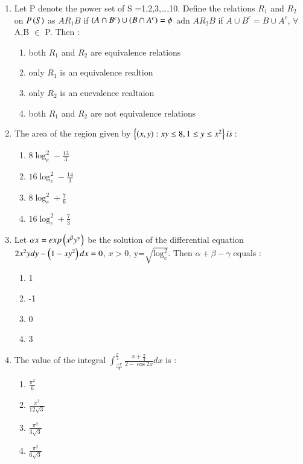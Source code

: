 \documentclass[journal]{IEEEtran}
\begin{document}
\begin{enumerate}
	\item Let P denote the power set of S ={1,2,3,\ldots,10}. Define the relations $R_1$ and $R_2$ on $P\left(S\right)$ as $AR_1B$ if $\left(A \cap B^c\right)\cup \left(B\cap A^c\right)=\phi$ adn $AR_2B$ if $A\cup B^c=B\cup A^c$, $\forall$ A,B $\in$ P. Then :
		\begin{enumerate}
			\item both $R_1$ and $R_2$ are equivalence relations
			\item only $R_1$ is an equivalence realtion
			\item only $R_2$ is an euevalence realtaion
			\item both $R_1$ and $R_2$ are not equivalence relations
        	\end{enumerate}	
	\item The area of the region given by $\left\{\left(x,y\right):xy \leq 8, 1 \leq y \leq x^2 \right\} is :$
		\begin{enumerate}
			\item $8 \log^{2}_e-\frac{13}{3}$
			\item $16 \log^{2}_e-\frac{14}{3}$
			\item $8 \log^{2}_e+\frac{7}{6}$
			\item $16 \log^{2}_e+\frac{7}{3}$
        	\end{enumerate}	
	\item Let $\alpha x=exp\left(x^\beta y^\gamma\right)$ be the solution of the differential equation $2x^2ydy-\left(1-xy^2\right)dx=0$, $x>0$, y=$\sqrt{\log_e^2}$. Then $\alpha + \beta - \gamma$ equals :
		\begin{enumerate}
			\item 1
			\item -1
			\item 0
			\item 3
        	\end{enumerate}
	\item The value of the integral $\int_\frac{-\pi}{4}^\frac{\pi}{4}\frac{x+\frac{\pi}{4}}{2-\cos 2x}dx$ is :
		\begin{enumerate}
			\item $\frac{\pi^2}{6}$
			\item $\frac{\pi^2}{12\sqrt{3}}$
	         	\item $\frac{\pi^2}{3\sqrt{3}}$
                 	\item $\frac{\pi^2}{6\sqrt{3}}$
	\end{enumerate}	
\end{enumerate}		
\end{document}
